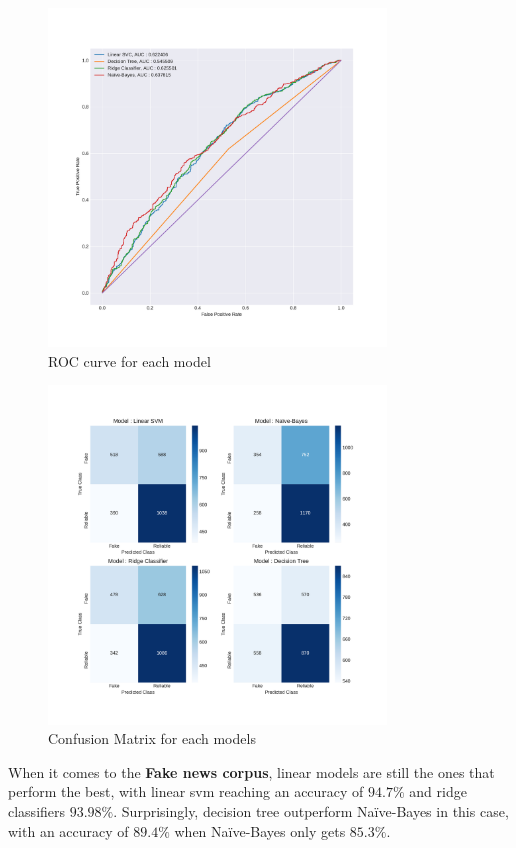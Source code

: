 \begin{figure}
 \centering
 \includegraphics[width=0.8\textwidth]{images/chapitre3/roc1}
 \caption{ROC curve for each model}
 \label{fig:chap3:roc1}
\end{figure}
\begin{figure}
 \centering
 \includegraphics[width=0.8\textwidth]{images/chapitre3/test_liar_confMat}
 \caption{Confusion Matrix for each models}
 \label{fig:chap3:confMat1}
\end{figure}
When it comes to the \textbf{Fake news corpus}, linear models are still the ones that perform the best, with linear svm reaching an accuracy of $94.7\%$ and ridge classifiers $93.98\%$. Surprisingly, decision tree outperform Na\"{i}ve-Bayes in this case, with an accuracy of $89.4\%$ when Na\"{i}ve-Bayes only gets $85.3\%$.\\
